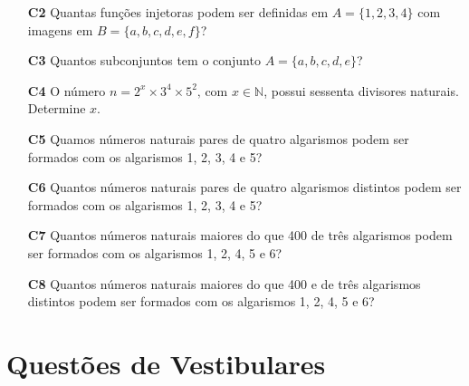 \documentclass[a4paper,12pt]{article}
\begin{document}
\begin{enumerate}
\begin{itemize}
   \end{itemize}  
    

\item[\textbf{C2}] Quantas funções injetoras podem ser definidas em $A = \{1, 2, 3, 4\}$ com imagens em $B = \{a, b, c, d, e, f\}$? 

\item[\textbf{C3}] Quantos subconjuntos tem o conjunto $A = \{a, b, c, d, e\}$? 

\item[\textbf{C4}] O número $n = 2^x \times 3^4 \times 5^2 \textrm{, com } x \in \mathbb{N}$, possui sessenta divisores naturais. Determine $x$. 

\item[\textbf{C5}] Quamos números naturais pares de quatro algarismos podem ser formados com os algarismos 1, 2, 3, 4 e 5? 

\item[\textbf{C6}] Quantos números naturais pares de quatro algarismos distintos podem ser formados com os algarismos 1, 2, 3, 4 e 5?

\item[\textbf{C7}] Quantos números naturais maiores do que 400 de três algarismos podem ser formados com os algarismos 1, 2, 4, 5 e 6?

\item[\textbf{C8}] Quantos números naturais maiores do que 400 e de três algarismos distintos podem ser formados com os algarismos 1, 2, 4, 5 e 6? 

\end{enumerate}

\section{Questões de Vestibulares}
\end{document}
